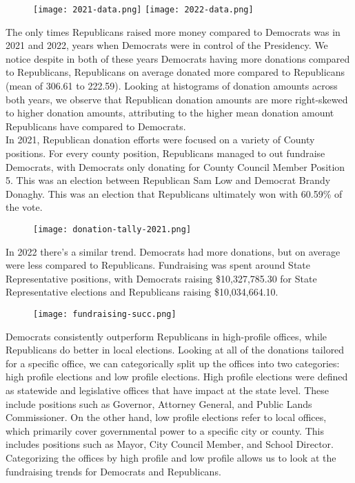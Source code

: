 \documentclass[9pt, compsoc, technote, a4paper]{IEEEtran}
\begin{document}
\begin{figure}[H]
    \begin{center}
        \texttt{[image: 2021-data.png]}
        \texttt{[image: 2022-data.png]}
    \end{center}
\end{figure}
    

The only times Republicans raised more money compared to Democrats was in 2021 and 2022, years when Democrats were in control of the Presidency. We notice despite in both of these years Democrats having more donations compared to Republicans, Republicans on average donated more compared to Republicans (mean of 306.61 to 222.59). Looking at histograms of donation amounts across both years, we observe that Republican donation amounts are more right-skewed to higher donation amounts, attributing to the higher mean donation amount
Republicans have compared to Democrats.\\
In 2021, Republican donation efforts were focused on a variety of County positions. For every county position, Republicans managed to 
out fundraise Democrats, with Democrats only donating for County Council Member Position 5. This was an election between Republican Sam Low and Democrat Brandy Donaghy.
This was an election that Republicans ultimately won with 60.59\% of the vote.\\
\begin{figure}[H]
    \begin{center}
        \texttt{[image: donation-tally-2021.png]}
    \end{center}
\end{figure}
In 2022 there's a similar trend. Democrats had more donations, but on average were less compared to Republicans. Fundraising was spent around State Representative positions, with Democrats raising \$10,327,785.30 for State Representative elections and Republicans raising \$10,034,664.10.\\
\begin{figure}[H]
    \begin{center}
        \texttt{[image: fundraising-succ.png]}
    \end{center}
\end{figure}
Democrats consistently outperform Republicans in high-profile offices, while Republicans do better in local elections. Looking at all of the donations tailored for a specific office, we can categorically split up the offices into two categories: high profile elections and low profile elections. High profile elections were defined as statewide and legislative offices that have impact at the state level. These include positions such as Governor, Attorney General, and Public Lands Commissioner. On the other hand, low profile elections refer to local offices, which primarily cover governmental power to a specific city or county. This includes positions such as Mayor, City Council Member, and School Director. Categorizing the offices by high profile and low profile allows us to look at the fundraising trends for Democrats and Republicans.\\
\end{document}
